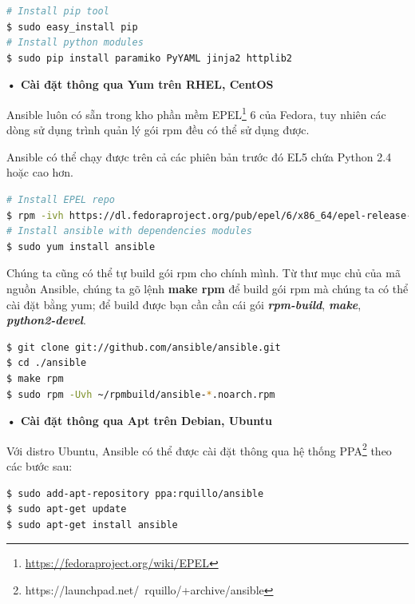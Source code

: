 \begin{lstlisting}[label={lst:ansible_install_module_pip},caption={Cài đặt các module cần thiết cho Ansible bằng pip}, language=bash, deletekeywords={}]
# Install pip tool
$ sudo easy_install pip
# Install python modules
$ sudo pip install paramiko PyYAML jinja2 httplib2
\end{lstlisting}

\textbf{• Cài đặt thông qua Yum trên RHEL, CentOS}

Ansible luôn có sẵn trong kho phần mềm EPEL\footnote{\url{https://fedoraproject.org/wiki/EPEL}} 6 của Fedora, tuy nhiên các dòng sử dụng trình quản lý gói rpm đều có thể sử dụng được.

Ansible có thể chạy được trên cả các phiên bản trước đó EL5 chứa Python 2.4 hoặc cao hơn.

\begin{lstlisting}[label={lst:ansible_install_yum},caption={Cài đặt Ansible từ mã nguồn}, language=bash, deletekeywords={}]
# Install EPEL repo
$ rpm -ivh https://dl.fedoraproject.org/pub/epel/6/x86_64/epel-release-6-8.noarch.rpm
# Install ansible with dependencies modules
$ sudo yum install ansible
\end{lstlisting}

Chúng ta cũng có thể tự build gói rpm cho chính mình. Từ thư mục chủ của mã nguồn Ansible, chúng ta gõ lệnh \textbf{make rpm} để build gói rpm mà chúng ta có thể cài đặt bằng yum; để build được bạn cần cần cái gói \textbf{\textit{rpm-build}}, \textbf{\textit{make}}, \textbf{\textit{python2-devel}}.

\begin{lstlisting}[label={lst:ansible_install_build_rpm},caption={Tự build gói rpm của Ansible}, language=bash, deletekeywords={}]
$ git clone git://github.com/ansible/ansible.git
$ cd ./ansible
$ make rpm
$ sudo rpm -Uvh ~/rpmbuild/ansible-*.noarch.rpm
\end{lstlisting}

\textbf{• Cài đặt thông qua Apt trên Debian, Ubuntu}

Với distro Ubuntu, Ansible có thể được cài đặt thông qua hệ thống PPA\footnote{https://launchpad.net/~rquillo/+archive/ansible} theo các bước sau:

\begin{lstlisting}[label={lst:ansible_install_ppa},caption={Cài đặt Ansible trên Ubuntu thông qua PPA}, language=bash, deletekeywords={}]
$ sudo add-apt-repository ppa:rquillo/ansible
$ sudo apt-get update
$ sudo apt-get install ansible
\end{lstlisting}

